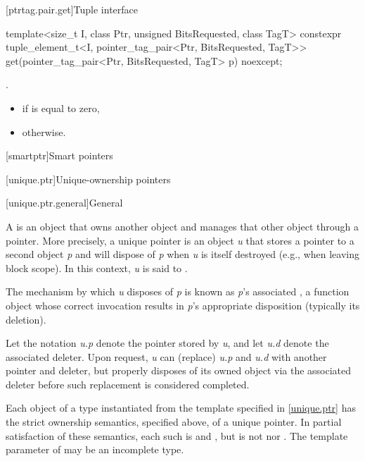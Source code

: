[ptrtag.pair.get]{Tuple interface}

%
\begin{itemdecl}
template<size_t I, class Ptr, unsigned BitsRequested, class TagT>
  constexpr tuple_element_t<I, pointer_tag_pair<Ptr, BitsRequested, TagT>>
    get(pointer_tag_pair<Ptr, BitsRequested, TagT> p) noexcept;
\end{itemdecl}

\begin{itemdescr}
\pnum
\mandates
.

\pnum
\returns
\begin{itemize}
\item {} if  is equal to zero,
\item {} otherwise.
\end{itemize}
\end{itemdescr}

[smartptr]{Smart pointers}

[unique.ptr]{Unique-ownership pointers}

[unique.ptr.general]{General}

\pnum
A  is an object that owns another object and
manages that other object through a pointer. More precisely, a unique pointer
is an object \textit{u} that stores a pointer to a second object \textit{p} and
will dispose of \textit{p} when \textit{u} is itself destroyed (e.g., when
leaving block scope). In this context, \textit{u} is said
to  .

\pnum
The mechanism by which \textit{u} disposes of \textit{p} is known as
\textit{p}'s associated , a function object whose correct
invocation results in \textit{p}'s appropriate disposition (typically its deletion).

\pnum
Let the notation \textit{u.p} denote the pointer stored by \textit{u}, and
let \textit{u.d} denote the associated deleter. Upon request, \textit{u} can
 (replace) \textit{u.p} and \textit{u.d} with another pointer and
deleter, but properly disposes of its owned object via the associated
deleter before such replacement is considered completed.

\pnum
Each object of a type  instantiated from the  template
specified in \ref{unique.ptr} has the strict ownership semantics, specified above,
of a unique pointer. In partial satisfaction of these semantics, each such 
is  and , but is not
 nor .
The template parameter  of  may be an incomplete type.

